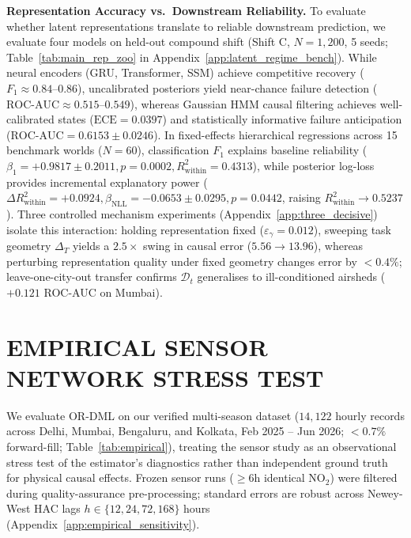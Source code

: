 \documentclass[twoside]{article}
\theoremstyle{definition}
\begin{document}
\textbf{Representation Accuracy vs.\ Downstream Reliability.} To evaluate whether latent representations translate to reliable downstream prediction, we evaluate four models on held-out compound shift (Shift C, $N=1,200$, 5 seeds; Table~\ref{tab:main_rep_zoo} in Appendix~\ref{app:latent_regime_bench}). While neural encoders (GRU, Transformer, SSM) achieve competitive recovery ($F_1 \approx 0.84\text{--}0.86$), uncalibrated posteriors yield near-chance failure detection ($\text{ROC-AUC} \approx 0.515\text{--}0.549$), whereas Gaussian HMM causal filtering achieves well-calibrated states ($\text{ECE} = 0.0397$) and statistically informative failure anticipation ($\text{ROC-AUC} = \mathbf{0.6153 \pm 0.0246}$). In fixed-effects hierarchical regressions across 15 benchmark worlds ($N=60$), classification $F_1$ explains baseline reliability ($\beta_1 = +0.9817 \pm 0.2011, p=0.0002, R^2_{\mathrm{within}} = 0.4313$), while posterior log-loss provides incremental explanatory power ($\Delta R^2_{\mathrm{within}} = +0.0924, \beta_{\mathrm{NLL}} = -0.0653 \pm 0.0295, p=0.0442$, raising $R^2_{\mathrm{within}} \to 0.5237$). Three controlled mechanism experiments (Appendix~\ref{app:three_decisive}) isolate this interaction: holding representation fixed ($\varepsilon_\gamma=0.012$), sweeping task geometry $\Delta_T$ yields a $2.5\times$ swing in causal error ($5.56\to 13.96$), whereas perturbing representation quality under fixed geometry changes error by $<0.4\%$; leave-one-city-out transfer confirms $\mathcal{D}_t$ generalises to ill-conditioned airsheds ($+0.121$ ROC-AUC on Mumbai).



\section{EMPIRICAL SENSOR NETWORK STRESS TEST}
\label{sec:empirical}
We evaluate OR-DML on our verified multi-season dataset ($14,122$ hourly records across Delhi, Mumbai, Bengaluru, and Kolkata, Feb 2025 -- Jun 2026; $<0.7\%$ forward-fill; Table~\ref{tab:empirical}), treating the sensor study as an observational stress test of the estimator's diagnostics rather than independent ground truth for physical causal effects. Frozen sensor runs ($\ge 6$h identical $\text{NO}_2$) were filtered during quality-assurance pre-processing; standard errors are robust across Newey-West HAC lags $h \in \{12, 24, 72, 168\}$ hours (Appendix~\ref{app:empirical_sensitivity}).
\end{document}
